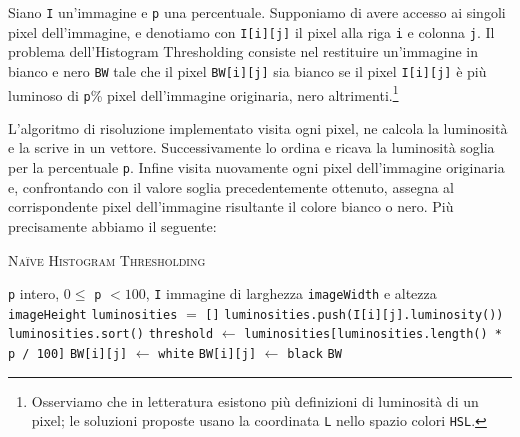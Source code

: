 \documentclass[12pt]{article}
\begin{document}
    Siano \texttt{I} un'immagine e \texttt{p} una percentuale. Supponiamo di 
    avere accesso ai singoli pixel dell'immagine, e denotiamo con 
    \texttt{I[i][j]} il pixel alla riga \texttt{i} e colonna \texttt{j}.
    Il problema dell'Histogram Thresholding consiste nel restituire
    un'immagine in bianco e nero \texttt{BW} tale che il pixel
    \texttt{BW[i][j]} sia bianco se il pixel \texttt{I[i][j]} è più luminoso
    di \texttt{p}\% pixel dell'immagine originaria, nero altrimenti.\footnote{
    Osserviamo che in letteratura esistono più definizioni di luminosità di 
    un pixel; le soluzioni proposte usano la coordinata \texttt{L} nello 
    spazio colori \texttt{HSL}.}

    L'algoritmo di risoluzione implementato visita ogni pixel, ne calcola la
    luminosit\`a e la scrive in un vettore. Successivamente lo ordina e
    ricava la luminosit\`a soglia per la percentuale \texttt{p}. Infine visita
    nuovamente ogni pixel dell'immagine originaria e, confrontando con il
    valore soglia precedentemente ottenuto, assegna al corrispondente pixel
    dell'immagine risultante il colore bianco o nero. Pi\`u precisamente
    abbiamo il seguente:

    \begin{algorithm}
      \caption{\textsc{Na\"ive Histogram Thresholding}}
      \begin{algorithmic}[1]
        \REQUIRE \texttt{p} intero, \(0 \le\) \texttt{p} \(< 100\), \texttt{I} immagine di larghezza \texttt{imageWidth} e altezza \texttt{imageHeight}
        \STATE \texttt{luminosities} \(=\) \texttt{[]}
            \STATE \texttt{luminosities.push(I[i][j].luminosity())}
          \ENDFOR
        \ENDFOR
        \STATE \texttt{luminosities.sort()}
        \STATE \texttt{threshold} \(\leftarrow\) \texttt{luminosities[luminosities.length() * p / 100]}
                \STATE \texttt{BW[i][j]} \(\leftarrow\) \texttt{white}
              \ELSE
                \STATE \texttt{BW[i][j]} \(\leftarrow\) \texttt{black}
              \ENDIF
            \ENDFOR
          \ENDFOR
          \RETURN \texttt{BW}
        \end{algorithmic}
    \end{algorithm}
\end{document}
